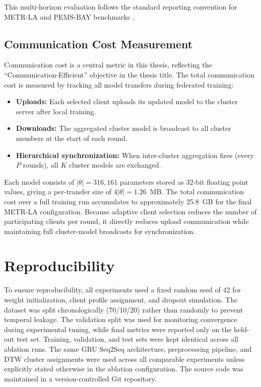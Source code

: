 This multi-horizon evaluation follows the standard reporting convention for METR-LA and PEMS-BAY benchmarks \cite{li2018, wu2019graphwavenet}.

\subsection{Communication Cost Measurement}

Communication cost is a central metric in this thesis, reflecting the ``Communication-Efficient'' objective in the thesis title. The total communication cost is measured by tracking all model transfers during federated training:

\begin{itemize}
    \item \textbf{Uploads:} Each selected client uploads its updated model to the cluster server after local training.
    \item \textbf{Downloads:} The aggregated cluster model is broadcast to all cluster members at the start of each round.
    \item \textbf{Hierarchical synchronization:} When inter-cluster aggregation fires (every $P$ rounds), all $K$ cluster models are exchanged.
\end{itemize}

Each model consists of $|\theta| = 316{,}161$ parameters stored as 32-bit floating point values, giving a per-transfer size of $4|\theta| = 1.26$~MB. The total communication cost over a full training run accumulates to approximately 25.8~GB for the final METR-LA configuration. Because adaptive client selection reduces the number of participating clients per round, it directly reduces upload communication while maintaining full cluster-model broadcasts for synchronization.

\section{Reproducibility}
\label{sec:reproducibility}

To ensure reproducibility, all experiments used a fixed random seed of 42 for weight initialization, client profile assignment, and dropout simulation. The dataset was split chronologically (70/10/20) rather than randomly to prevent temporal leakage. The validation split was used for monitoring convergence during experimental tuning, while final metrics were reported only on the held-out test set. Training, validation, and test sets were kept identical across all ablation runs. The same GRU Seq2Seq architecture, preprocessing pipeline, and DTW cluster assignments were used across all comparable experiments unless explicitly stated otherwise in the ablation configuration. The source code was maintained in a version-controlled Git repository.

